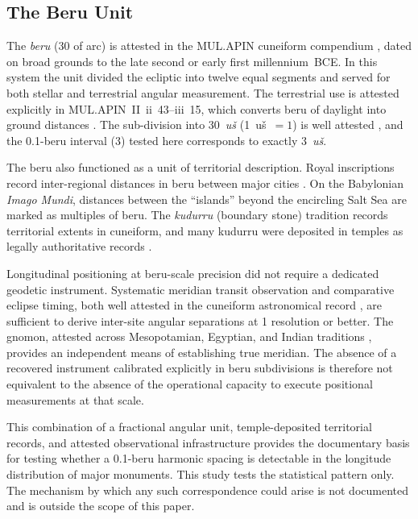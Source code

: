 \documentclass[12pt,a4paper]{article}
\begin{document}
\subsection{The Beru Unit}
\label{sec:beru}

The \textit{beru} (30\textdegree{} of arc) is attested in the MUL.APIN
cuneiform compendium \citep{hunger2019mul,watson2011writing}, dated on broad
grounds to the late second or early first millennium~BCE. In this system the
unit divided the ecliptic into twelve equal segments and served for both stellar
and terrestrial angular measurement. The terrestrial use is attested explicitly
in MUL.APIN~II~ii~43--iii~15, which converts beru of daylight into ground
distances \citep[pp.~2--15]{hunger2019mul}. The sub-division into
30~\textit{u\v{s}} (1~u\v{s}~$= 1$\textdegree{}) is well attested
\citep{hunger2019mul,robson2008mathematics}, and the 0.1-beru interval
(3\textdegree{}) tested here corresponds to exactly 3~\textit{u\v{s}}.

The beru also functioned as a unit of territorial description. Royal
inscriptions record inter-regional distances in beru between major cities
\citep{neugebauer1975history,robson2008mathematics}. On the Babylonian
\textit{Imago Mundi}, distances between the ``islands'' beyond the encircling
Salt Sea are marked as multiples of beru. The \textit{kudurru} (boundary stone)
tradition records territorial extents in cuneiform, and many kudurru were
deposited in temples as legally authoritative records
\citep{robson2008mathematics,powell1987metrological}.

Longitudinal positioning at beru-scale precision did not require a dedicated
geodetic instrument. Systematic meridian transit observation and comparative
eclipse timing, both well attested in the cuneiform astronomical record
\citep{hunger2019mul,neugebauer1975history}, are sufficient to derive inter-site
angular separations at 1\textdegree{} resolution or better. The gnomon,
attested across Mesopotamian, Egyptian, and Indian traditions
\citep{neugebauer1975history,shamasastry1915arthashastra}, provides an independent means of
establishing true meridian. The absence of a recovered instrument calibrated
explicitly in beru subdivisions is therefore not equivalent to the absence
of the operational capacity to execute positional measurements at that scale.

This combination of a fractional angular unit, temple-deposited territorial
records, and attested observational infrastructure provides the documentary
basis for testing whether a 0.1-beru harmonic spacing is detectable in the
longitude distribution of major monuments. This study tests the statistical
pattern only. The mechanism by which any such correspondence could arise is
not documented and is outside the scope of this paper.
\end{document}
